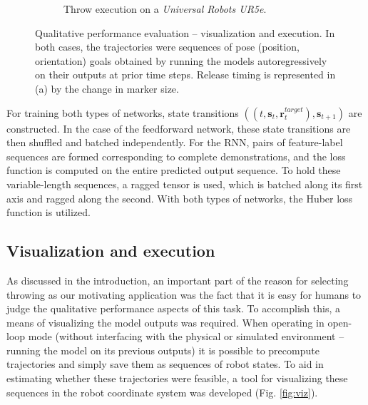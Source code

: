 \documentclass{article}
\begin{document}
\begin{figure}
{\begin{subfigure}{0.48\textwidth}
			\caption{Throw execution on a \emph{Universal Robots UR5e}.}
			\label{fig:exec}
		\end{subfigure}
	}
	\caption{Qualitative performance evaluation -- visualization and execution. In both cases, the trajectories were sequences of pose (position, orientation) goals obtained by running the models autoregressively on their outputs at prior time steps. Release timing is represented in (a) by the change in marker size.}
	\label{fig:vis_exec}
\end{figure}

For training both types of networks, state transitions $\left(\left(t,\mathbf{s}_t,\mathbf{r}^{target}_t\right), \mathbf{s}_{t+1}\right)$ are constructed. In the case of the feedforward network, these state transitions are then shuffled and batched independently. For the RNN, pairs of feature-label sequences are formed corresponding to complete demonstrations, and the loss function is computed on the entire predicted output sequence. To hold these variable-length sequences, a ragged tensor is used, which is batched along its first axis and ragged along the second. With both types of networks, the Huber loss function is utilized.

\subsection{Visualization and execution}
\label{sec:exec}

As discussed in the introduction, an important part of the reason for selecting throwing as our motivating application was the fact that it is easy for humans to judge the qualitative performance aspects of this task. To accomplish this, a means of visualizing the model outputs was required. When operating in open-loop mode (without interfacing with the physical or simulated environment -- running the model on its previous outputs) it is possible to precompute trajectories and simply save them as sequences of robot states. To aid in estimating whether these trajectories were feasible, a tool for visualizing these sequences in the robot coordinate system was developed (Fig. \ref{fig:viz}).
\end{document}
